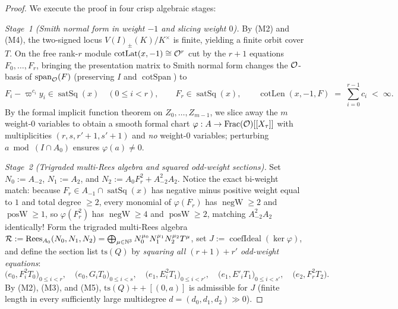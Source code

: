 \begin{proof}
We execute the proof in four crisp algebraic stages:

\emph{Stage~1 (Smith normal form in weight $-1$ and slicing weight $0$).}
By (M2) and (M4), the two-signed locus $V(I)_{\pm}(K) / K^\times$ is finite, yielding a finite orbit cover $T$. On the free rank-$r$ module $\operatorname{cotLat}(x, -1) \cong \mathcal{O}^r$ cut by the $r + 1$ equations $F_0, \dots, F_r$, bringing the presentation matrix to Smith normal form changes the $\mathcal{O}$-basis of $\operatorname{span}_{\mathcal{O}}(F)$ (preserving $I$ and $\operatorname{cotSpan}$) to
\[
  F_i - \varpi^{c_i} y_i \in \operatorname{satSq}(x) \quad (0 \le i < r), \qquad
  F_r \in \operatorname{satSq}(x), \qquad
  \operatorname{cotLen}(x, -1, F) \;=\; \sum_{i = 0}^{r - 1} c_i \;<\; \infty.
\]
By the formal implicit function theorem on $Z_0, \dots, Z_{m-1}$, we slice away the $m$ weight-$0$ variables to obtain a smooth formal chart $\varphi : A \to \operatorname{Frac}(\mathcal{O})[[X_\tau]]$ with multiplicities $(r, s, r'+1, s'+1)$ and \emph{no} weight-$0$ variables; perturbing $a \bmod (I \cap A_0)$ ensures $\varphi(a) \neq 0$.

\emph{Stage~2 (Trigraded multi-Rees algebra and squared odd-weight sections).}
Set $N_0 := A_{-2}$, $N_1 := A_2$, and $N_2 := A_0 F_r^2 + A_{-2}^2 A_2$. Notice the exact bi-weight match: because $F_r \in A_{-1} \cap \operatorname{satSq}(x)$ has negative minus positive weight equal to $1$ and total degree $\ge 2$, every monomial of $\varphi(F_r)$ has $\operatorname{negW} \ge 2$ and $\operatorname{posW} \ge 1$, so $\varphi(F_r^2)$ has $\operatorname{negW} \ge 4$ and $\operatorname{posW} \ge 2$, matching $A_{-2}^2 A_2$ identically! Form the trigraded multi-Rees algebra $\mathcal{R} := \operatorname{Rees}_{A_0}(N_0, N_1, N_2) = \bigoplus_{\mu \in \mathbb{N}^3} N_0^{\mu_0} N_1^{\mu_1} N_2^{\mu_2} T^\mu$, set $J := \operatorname{coefIdeal}(\ker\varphi)$, and define the section list $\mathrm{ts}(Q)$ by \emph{squaring all $(r+1) + r'$ odd-weight equations}:
\[
  \bigl(e_0, F_i^2 T_0\bigr)_{0 \le i < r}, \quad
  \bigl(e_0, G_i T_0\bigr)_{0 \le i < s}, \quad
  \bigl(e_1, E_i^2 T_1\bigr)_{0 \le i < r'}, \quad
  \bigl(e_1, E'_i T_1\bigr)_{0 \le i < s'}, \quad
  \bigl(e_2, F_r^2 T_2\bigr).
\]
By (M2), (M3), and (M5), $\mathrm{ts}(Q) \mathbin{+\!+} [(0, a)]$ is admissible for $J$ (finite length in every sufficiently large multidegree $d = (d_0, d_1, d_2) \gg 0$).


\end{proof}
